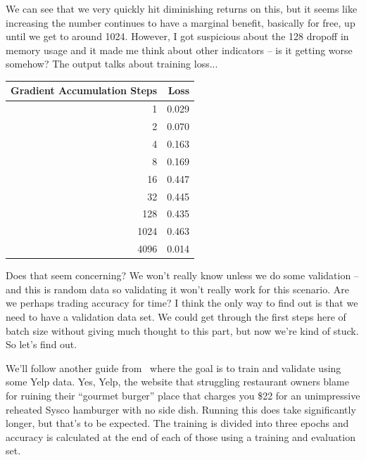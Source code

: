 \documentclass[a4paper]{report}
\begin{document}
We can see that we very quickly hit diminishing returns on this, but it seems like increasing the number continues to have a marginal benefit, basically for free, up until we get to around 1024. However, I got suspicious about the 128 dropoff in memory usage and it made me think about other indicators -- is it getting worse somehow? The output talks about training loss...

\begin{center}
\begin{tabular}{r|r}
\textbf{Gradient Accumulation Steps} & \textbf{Loss} \\ \hline
1 & 0.029 \\
2 & 0.070 \\
4 & 0.163 \\
8 & 0.169 \\
16 & 0.447 \\
32 & 0.445 \\
128 & 0.435 \\
1024 & 0.463 \\
4096 & 0.014 \\
\end{tabular}
\end{center}

Does that seem concerning? We won't really know unless we do some validation -- and this is random data so validating it won't really work for this scenario. Are we perhaps trading accuracy for time? I think the only way to find out is that we need to have a validation data set. We could get through the first steps here of batch size without giving much thought to this part, but now we're kind of stuck. So let's find out.

We'll follow another guide from~\cite{hf3} where the goal is to train and validate using some Yelp data. Yes, Yelp, the website that struggling restaurant owners blame for ruining their ``gourmet burger'' place that charges you \$22 for an unimpressive reheated Sysco hamburger with no side dish. Running this does take significantly longer, but that's to be expected. The training is divided into three epochs and accuracy is calculated at the end of each of those using a training and evaluation set.
\end{document}
